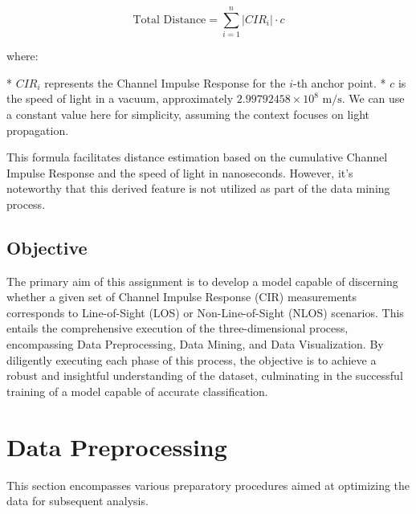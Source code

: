\documentclass[
	article, %
	11pt, %
]{CSUniSchoolLabReport}
\begin{document}


\begin{equation}
\text{Total Distance} = \sum_{i=1}^{n} |CIR_i| \cdot c
\end{equation}

where:

* $CIR_i$ represents the Channel Impulse Response for the $i$-th anchor point.
* $c$ is the speed of light in a vacuum, approximately $2.99792458 \times 10^8 \text{ m/s}$. We can use a constant value here for simplicity, assuming the context focuses on light propagation.

This formula facilitates distance estimation based on the cumulative Channel Impulse Response and the speed of light in nanoseconds. However, it's noteworthy that this derived feature is not utilized as part of the data mining process.



\subsection{Objective}\label{objective}

The primary aim of this assignment is to develop a model capable of discerning whether a given set of Channel Impulse Response (CIR) measurements corresponds to Line-of-Sight (LOS) or Non-Line-of-Sight (NLOS) scenarios. This entails the comprehensive execution of the three-dimensional process, encompassing Data Preprocessing, Data Mining, and Data Visualization. By diligently executing each phase of this process, the objective is to achieve a robust and insightful understanding of the dataset, culminating in the successful training of a model capable of accurate classification.


\section{Data Preprocessing}\label{data_preprocessing}

This section encompasses various preparatory procedures aimed at optimizing the data for subsequent analysis.
\end{document}

